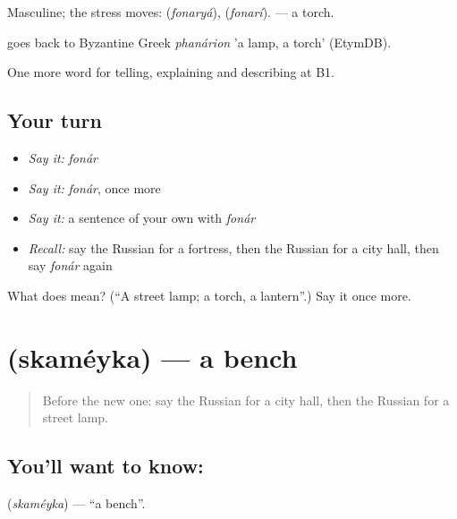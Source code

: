 Masculine; the stress moves: \emph{} (\emph{fonaryá}), \emph{} (\emph{fonarí}). \emph{ } — a torch.

\begin{cousinweb}
\emph{} goes back to Byzantine Greek \emph{phanárion} 'a lamp, a torch' (EtymDB).
\end{cousinweb}

\begin{grammarlens}[title={What you've built}]
One more word for telling, explaining and describing at B1.
\end{grammarlens}

\subsection*{Your turn}
\begin{itemize}
\raggedright
  \item \emph{Say it:} \emph{fonár}
  \item \emph{Say it:} \emph{fonár}, once more
  \item \emph{Say it:} a sentence of your own with \emph{fonár}
  \item \emph{Recall:} say the Russian for a fortress, then the Russian for a city hall, then say \emph{fonár} again
\end{itemize}

\begin{tcolorbox}[breakable,colback=teal!4,colframe=teal!35!black,title={Before you move on}]
What does  mean? (\textquotedblleft{}A street lamp; a torch, a lantern\textquotedblright{}.) Say it once more.
\end{tcolorbox}
\section[\texorpdfstring{\ru{скамейка} (skaméyka)}{скамейка (skaméyka)}]{ (skaméyka) — a bench}

\label{lesson:RU-C445-skameyka}



\begin{quote}
Before the new one: say the Russian for a city hall, then the Russian for a street lamp.
\end{quote}

\subsection*{You'll want to know: }
\textbf{} (\emph{skaméyka}) — \textquotedblleft{}a bench\textquotedblright{}.

